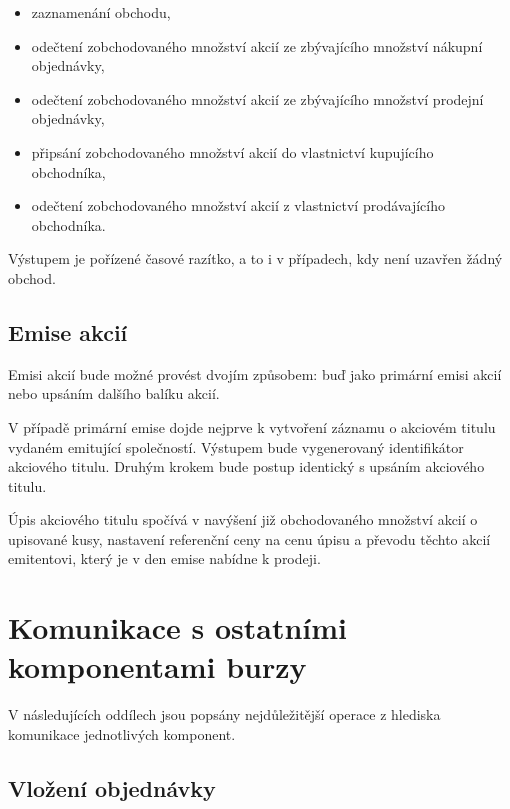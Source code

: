 \documentclass[thesis=M,czech]{FITthesis}[2012/06/26]
\begin{document}
\begin{itemize}
	\item zaznamenání obchodu,
	\item odečtení zobchodovaného množství akcií ze zbývajícího množství nákupní objednávky,
	\item odečtení zobchodovaného množství akcií ze zbývajícího množství prodejní objednávky,
	\item připsání zobchodovaného množství akcií do vlastnictví kupujícího obchodníka,
	\item odečtení zobchodovaného množství akcií z vlastnictví prodávajícího obchodníka.
\end{itemize}

Výstupem je pořízené časové razítko, a to i v případech, kdy není uzavřen žádný obchod. 


\subsection{Emise akcií}
\label{sec:emitstocks}

Emisi akcií bude možné provést dvojím způsobem: buď jako primární emisi akcií \cite{htsmw} nebo upsáním dalšího balíku akcií. 

V případě primární emise dojde nejprve k vytvoření záznamu o akciovém titulu vydaném emitující společností. Výstupem bude
vygenerovaný identifikátor akciového titulu. Druhým krokem bude postup identický s upsáním akciového titulu.

Úpis akciového titulu spočívá v navýšení již obchodovaného množství akcií o upisované kusy, nastavení referenční ceny na 
cenu úpisu a převodu těchto akcií emitentovi, který je v den emise nabídne k prodeji. 


\section{Komunikace s ostatními komponentami burzy}

V následujících oddílech jsou popsány nejdůležitější operace z hlediska komunikace jednotlivých komponent.


\subsection{Vložení objednávky}
\end{document}
